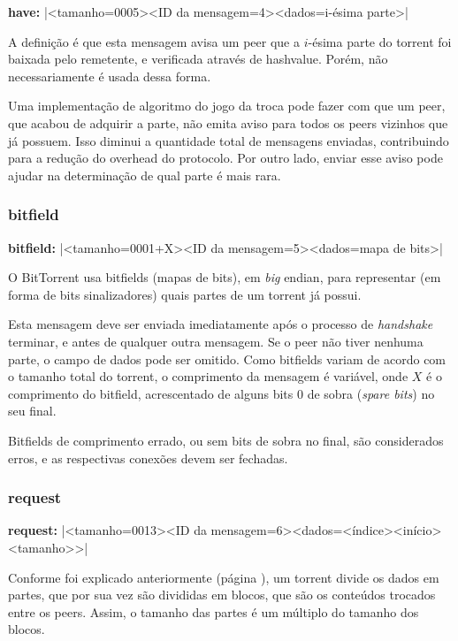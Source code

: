 \textbf{have:} \bverb|<tamanho=0005><ID da mensagem=4><dados=i-ésima parte>|

A definição é que esta mensagem avisa um \gls*{peer} que a $i$-ésima parte do
\gls*{torrent} foi baixada pelo remetente, e verificada através de \gls*{hashvalue}.
Porém, não necessariamente é usada dessa forma.


Uma implementação de algoritmo do jogo da troca pode fazer com que um \gls*{peer}, que
acabou de adquirir a parte, não emita aviso para todos os \glspl*{peer} vizinhos que já
possuem. Isso diminui a quantidade total de mensagens enviadas, contribuindo para a
redução do \gls{overhead} do protocolo. Por outro lado, enviar esse aviso pode ajudar
na determinação de qual parte é mais rara.

\subsubsection*{bitfield}

\textbf{bitfield:} \bverb|<tamanho=0001+X><ID da mensagem=5><dados=mapa de bits>|

O BitTorrent usa bitfields (mapas de bits), em \emph{big} \gls*{endian}, para
representar (em forma de bits sinalizadores) quais partes de um \gls*{torrent} já
possui.

Esta mensagem deve ser enviada imediatamente após o processo de \emph{handshake}
terminar, e antes de qualquer outra mensagem. Se o \gls*{peer} não tiver nenhuma parte,
o campo de dados pode ser omitido. Como bitfields variam de acordo com o tamanho total
do \gls*{torrent}, o comprimento da mensagem é variável, onde $X$ é o comprimento do
bitfield, acrescentado de alguns bits 0 de sobra (\emph{spare bits}) no seu final.

Bitfields de comprimento errado, ou sem bits de sobra no final, são considerados erros,
e as respectivas conexões devem ser fechadas.


\subsubsection*{request}

\textbf{request:} \bverb|<tamanho=0013><ID da mensagem=6><dados=<índice><início><tamanho>>|

Conforme foi explicado anteriormente (página \pageref{subsec:partes}), um
\gls*{torrent} divide os dados em partes, que por sua vez são divididas em blocos, que
são os conteúdos trocados entre os \glspl*{peer}. Assim, o tamanho das partes é um
múltiplo do tamanho dos blocos.

